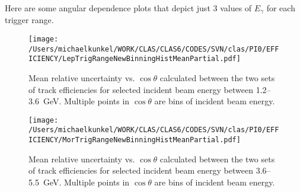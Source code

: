 \documentclass[11pt,a4paper]{article}
\newlength{\figwidth}
\newlength{\hfigheight}
\begin{document}
Here are some angular dependence plots that depict just 3 values of $E_{\gamma}$ for each trigger range.
\begin{figure}[h!]\begin{center}
		\texttt{[image: /Users/michaelkunkel/WORK/CLAS/CLAS6/CODES/SVN/clas/PI0/EFFICIENCY/LepTrigRangeNewBinningHistMeanPartial.pdf]}
		\caption{Mean relative uncertainty vs. $\cos \theta$ calculated between the two sets of track efficiencies for selected incident beam energy between 1.2--3.6~GeV. Multiple points in $\cos \theta$ are bins of incident beam energy. }\label{fig:leptrigcostheta}
	\end{center}\end{figure}
	
	\begin{figure}[h!]\begin{center}
			\texttt{[image: /Users/michaelkunkel/WORK/CLAS/CLAS6/CODES/SVN/clas/PI0/EFFICIENCY/MorTrigRangeNewBinningHistMeanPartial.pdf]}
			\caption{Mean relative uncertainty vs. $\cos \theta$ calculated between the two sets of track efficiencies for selected incident beam energy between 3.6--5.5~GeV. Multiple points in $\cos \theta$ are bins of incident beam energy.}\label{fig:mortrigcostheta}
		\end{center}\end{figure}
		\FloatBarrier
\end{document}
